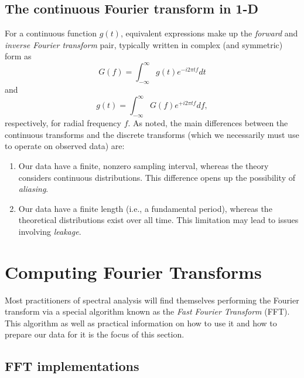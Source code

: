 \subsection{The continuous Fourier transform in 1-D}

For a continuous function $g(t)$,  equivalent expressions make up the \emph{forward} and \emph{inverse Fourier transform} pair,
typically written in complex (and symmetric) form as
\begin{equation}
G(f) = \int ^\infty _{-\infty} g(t) e^{-i 2 \pi t f} dt
\label{eq:FT1D}
\end{equation}
and
\begin{equation}
g(t) = \int ^\infty _{-\infty} G(f) e^{+i 2 \pi t f} df,
\label{eq:IFT1D}
\end{equation}
respectively, for radial frequency $f$.  As noted, the main differences between the continuous transforms and the discrete transforms
(which we necessarily must use to operate on observed data) are:
\begin{enumerate}
	\item Our data have a finite, nonzero sampling interval, whereas the theory considers continuous distributions.
	This difference opens up the possibility of \emph{aliasing}.
	\item Our data have a finite length (i.e., a fundamental period), whereas the theoretical distributions exist over all time.
	This limitation may lead to issues involving \emph{leakage}.
\end{enumerate}

\section{Computing Fourier Transforms}
Most practitioners of spectral analysis will find themselves performing the Fourier transform via a special
algorithm known as the \emph{Fast Fourier Transform} (FFT).  This algorithm as well as practical information on how
to use it and how to prepare our data for it is the focus of this section.

\subsection{FFT implementations}

